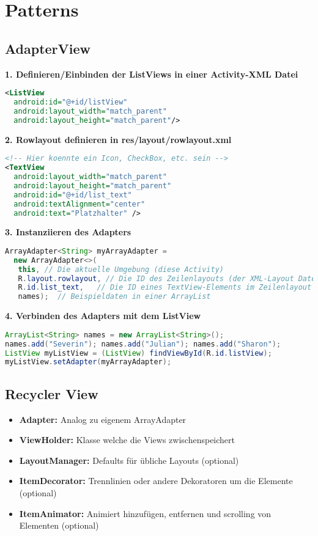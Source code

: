 \section{Patterns}
\subsection{AdapterView}
\textbf{1. Definieren/Einbinden der ListViews in einer Activity-XML Datei}
\begin{lstlisting}[language=xml]
<ListView
  android:id="@+id/listView"
  android:layout_width="match_parent"
  android:layout_height="match_parent"/>
\end{lstlisting}
\textbf{2. Rowlayout definieren in res/layout/rowlayout.xml}
\begin{lstlisting}[language=xml]
<!-- Hier koennte ein Icon, CheckBox, etc. sein -->
<TextView
  android:layout_width="match_parent"
  android:layout_height="match_parent"
  android:id="@+id/list_text"
  android:textAlignment="center"
  android:text="Platzhalter" />
\end{lstlisting}
\textbf{3. Instanziieren des Adapters}
\begin{lstlisting}[language=java]
ArrayAdapter<String> myArrayAdapter =
  new ArrayAdapter<>(
   this, // Die aktuelle Umgebung (diese Activity)
   R.layout.rowlayout, // Die ID des Zeilenlayouts (der XML-Layout Datei)
   R.id.list_text,   // Die ID eines TextView-Elements im Zeilenlayout
   names);  // Beispieldaten in einer ArrayList
\end{lstlisting}
\textbf{4. Verbinden des Adapters mit dem ListView}
\begin{lstlisting}[language=java]
ArrayList<String> names = new ArrayList<String>();
names.add("Severin"); names.add("Julian"); names.add("Sharon");
ListView myListView = (ListView) findViewById(R.id.listView);
myListView.setAdapter(myArrayAdapter);
\end{lstlisting}

\subsection{Recycler View} 
\begin{itemize}
\item \textbf{Adapter:} Analog zu eigenem ArrayAdapter
\item \textbf{ViewHolder:} Klasse welche die Views zwischenspeichert
\item \textbf{LayoutManager:} Defaults für übliche Layouts (optional)
\item \textbf{ItemDecorator:} Trennlinien oder andere Dekoratoren um die Elemente (optional)
\item \textbf{ItemAnimator:} Animiert hinzufügen, entfernen und scrolling von Elementen (optional)
\end{itemize}

